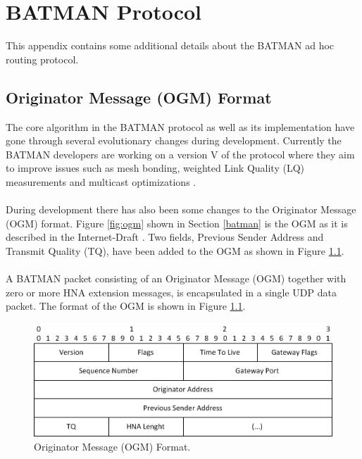 \chapter{BATMAN Protocol}
\label{appendix_batman}
This appendix contains some additional details about the BATMAN ad hoc routing protocol.

\section{Originator Message (OGM) Format}
The core algorithm in the BATMAN protocol as well as its implementation have gone through several evolutionary changes during development. Currently the BATMAN developers are working on a version V of the protocol where they aim to improve issues such as mesh bonding, weighted Link Quality (LQ) measurements and multicast optimizations \cite{open_mesh_v}.
\\\\
During development there has also been some changes to the Originator Message (OGM) format. Figure \ref{fig:ogm} shown in Section \ref{batman} is the OGM as it is described in the Internet-Draft \cite{batman_rfc}. Two fields, Previous Sender Address and Transmit Quality (TQ), have been added to the OGM as shown in Figure \ref{fig:app_ogm}.
\\\\
A BATMAN packet consisting of an Originator Message (OGM) together with zero or more HNA extension messages, is encapsulated in a single UDP data packet. The format of the OGM is shown in Figure \ref{fig:app_ogm}.

\begin{figure}[ht]
	\centering
		\includegraphics{images/ogm_v2.png}
	\caption{Originator Message (OGM) Format.}
	\label{fig:app_ogm}
\end{figure}

